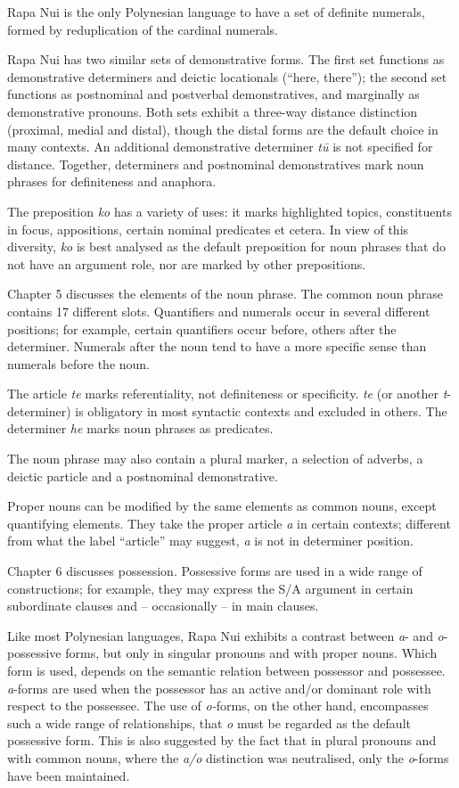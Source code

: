 Rapa Nui is the only Polynesian language to have a set of definite numerals, formed by reduplication of the cardinal numerals. 

Rapa Nui has two similar sets of demonstrative forms. The first set functions as demonstrative determiners and deictic locationals (“here, there”); the second set functions as postnominal and postverbal demonstratives, and marginally as demonstrative pronouns. Both sets exhibit a three-way distance distinction (proximal, medial and distal), though the distal forms are the default choice in many contexts. An additional demonstrative determiner \textit{tū} is not specified for distance. Together, determiners and postnominal demonstratives mark noun phrases for definiteness and anaphora.

The preposition \textit{ko} has a variety of uses: it marks highlighted topics, constituents in focus, appositions, certain nominal predicates et cetera. In view of this diversity, \textit{ko} is best analysed as the default preposition for noun phrases that do not have an argument role, nor are marked by other prepositions.

\medskip Chapter 5 discusses the elements of the noun phrase. The common noun phrase contains 17 different slots. Quantifiers and numerals occur in several different positions; for example, certain quantifiers occur before, others after the determiner. Numerals after the noun tend to have a more specific sense than numerals before the noun.

The article \textit{te} marks referentiality, not definiteness or specificity. \textit{te} (or another \textit{t}{}-determiner) is obligatory in most syntactic contexts and excluded in others. The determiner \textit{he} marks noun phrases as predicates.

The noun phrase may also contain a plural marker, a selection of adverbs, a deictic particle and a postnominal demonstrative. 

Proper nouns can be modified by the same elements as common nouns, except quantifying elements. They take the proper article \textit{a} in certain contexts; different from what the label “article” may suggest, \textit{a} is not in determiner position. 

\medskip Chapter 6 discusses possession. Possessive forms are used in a wide range of constructions; for example, they may express the S/A argument in certain subordinate clauses and – occasionally – in main clauses. 

Like most Polynesian languages, Rapa Nui exhibits a contrast between \textit{a}{}- and \textit{o}{}-possessive forms, but only in singular pronouns and with proper nouns. Which form is used, depends on the semantic relation between possessor and possessee. \textit{a}{}-forms are used when the possessor has an active and/or dominant role with respect to the possessee. The use of \textit{o-}forms, on the other hand, encompasses such a wide range of relationships, that \textit{o} must be regarded as the default possessive form. This is also suggested by the fact that in plural pronouns and with common nouns, where the \textit{a/o} distinction was neutralised, only the \textit{o}{}-forms have been maintained.

